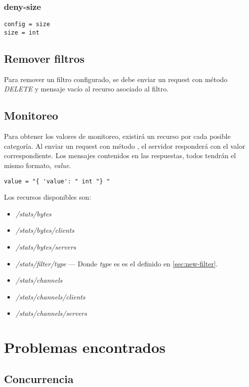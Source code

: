 \documentclass[11pt,a4paper,titlepage]{article}
\begin{document}
\subsubsection{deny-size}
\begin{verbatim}
config = size
size = int
\end{verbatim}

\subsection{Remover filtros}
Para remover un filtro configurado, se debe enviar un request con método \textit{DELETE} y mensaje vacío al recurso asociado al filtro.

\subsection{Monitoreo}
Para obtener los valores de monitoreo, existirá un recurso por cada posible categoría.
Al enviar un request con método , el servidor responderá con el valor correspondiente.
Los mensajes contenidos en las respuestas, todos tendrán el mismo formato, \textit{value}.
\begin{verbatim}
value = "{ 'value': " int "} "
\end{verbatim}

Los recursos disponibles son:
\begin{itemize}
    \item \textit{/stats/bytes}
    \item \textit{/stats/bytes/clients}
    \item \textit{/stats/bytes/servers}
    \item \textit{/stats/filter/type} --- Donde \textit{type} es es el definido en \ref{sec:new-filter}.
    \item \textit{/stats/channels}
    \item \textit{/stats/channels/clients}
    \item \textit{/stats/channels/servers}
\end{itemize}

\section{Problemas encontrados}
    \subsection{Concurrencia}
\end{document}

